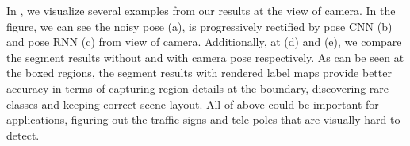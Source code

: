 
In , we visualize several examples from our results at the view of camera. In the figure, we can see the noisy pose (a), is progressively rectified by pose CNN (b) and pose RNN (c) from view of camera. 
Additionally, at (d) and (e), we compare the segment results without and with camera pose respectively. As can be seen at the boxed regions, the segment results with rendered label maps provide better accuracy in terms of capturing region details at the boundary, discovering rare classes and keeping correct scene layout. All of above could be important for applications, \eg figuring out the traffic signs and tele-poles that are visually hard to detect.

